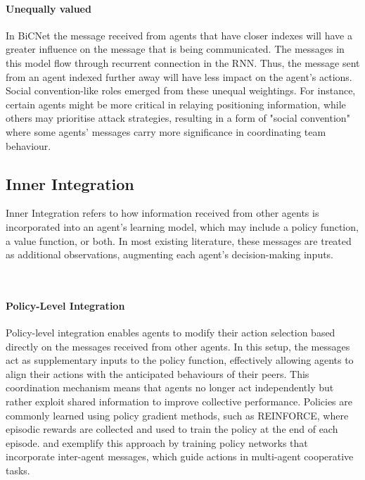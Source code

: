 \documentclass{article}
\begin{document}
\paragraph{Unequally valued} In BiCNet \citep{peng2017bicnet} the message received from agents that have closer indexes will have a greater influence on the message that is being communicated. The messages in this model flow through recurrent connection in the RNN. Thus, the message sent from an agent indexed further away will have less impact on the agent's actions. Social convention-like roles emerged from these unequal weightings. For instance, certain agents might be more critical in relaying positioning information, while others may prioritise attack strategies, resulting in a form of "social convention" where some agents’ messages carry more significance in coordinating team behaviour.

\subsection{Inner Integration}

Inner Integration refers to how information received from other agents is incorporated into an agent’s learning model, which may include a policy function, a value function, or both. In most existing literature, these messages are treated as additional observations, augmenting each agent's decision-making inputs.

\

\paragraph{Policy-Level Integration}
Policy-level integration enables agents to modify their action selection based directly on the messages received from other agents. In this setup, the messages act as supplementary inputs to the policy function, effectively allowing agents to align their actions with the anticipated behaviours of their peers. This coordination mechanism means that agents no longer act independently but rather exploit shared information to improve collective performance. Policies are commonly learned using policy gradient methods, such as REINFORCE, where episodic rewards are collected and used to train the policy at the end of each episode.\citet{sukhbaatar2016commnet} and \citet{singh2018ic3net} exemplify this approach by training policy networks that incorporate inter-agent messages, which guide actions in multi-agent cooperative tasks.
\end{document}
